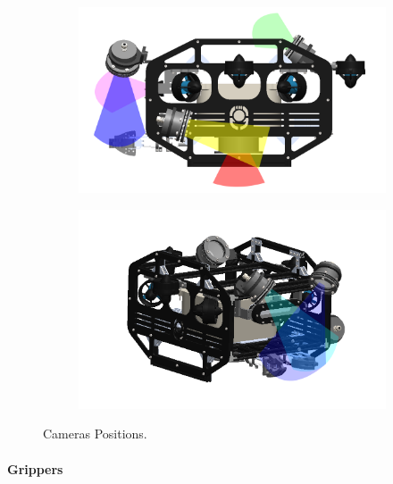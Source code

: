 \begin{figure}[h]
    \centering
    \begin{subfigure}[b]{0.48\columnwidth}
        \includegraphics[width=\textwidth]{Sections/2Design Rationale/images/camera_positions1.png}
    \end{subfigure}
    \hfill
    \begin{subfigure}[b]{0.48\columnwidth}
        \includegraphics[width=\textwidth]{Sections/2Design Rationale/images/camera_positions2.png}
    \end{subfigure}
    \caption{Cameras Positions.}
    \label{fig:camera_positions}
\end{figure}

\vspace{-0.3cm}
\paragraph{Grippers} \ \\
\vspace{-0.5cm}

